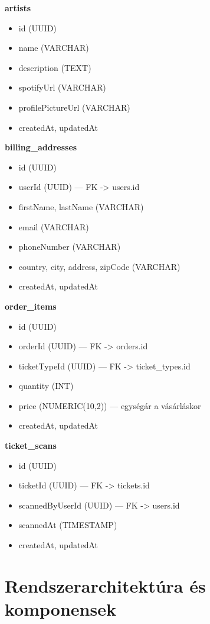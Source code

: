 \documentclass[colorlinks]{docs}
\theoremstyle{definition}
\theoremstyle{remark}
\begin{document}
\textbf{artists}
\begin{itemize}
    \item id (UUID)
    \item name (VARCHAR)
    \item description (TEXT)
    \item spotifyUrl (VARCHAR)
    \item profilePictureUrl (VARCHAR)
    \item createdAt, updatedAt
\end{itemize}

\textbf{billing\_addresses}
\begin{itemize}
    \item id (UUID)
    \item userId (UUID) — FK -> users.id
    \item firstName, lastName (VARCHAR)
    \item email (VARCHAR)
    \item phoneNumber (VARCHAR)
    \item country, city, address, zipCode (VARCHAR)
    \item createdAt, updatedAt
\end{itemize}

\textbf{order\_items}
\begin{itemize}
    \item id (UUID)
    \item orderId (UUID) — FK -> orders.id
    \item ticketTypeId (UUID) — FK -> ticket\_types.id
    \item quantity (INT)
    \item price (NUMERIC(10,2)) — egységár a vásárláskor
    \item createdAt, updatedAt
\end{itemize}

\textbf{ticket\_scans}
\begin{itemize}
    \item id (UUID)
    \item ticketId (UUID) — FK -> tickets.id
    \item scannedByUserId (UUID) — FK -> users.id
    \item scannedAt (TIMESTAMP)
    \item createdAt, updatedAt
\end{itemize}

\section{Rendszerarchitektúra és komponensek}
\end{document}

